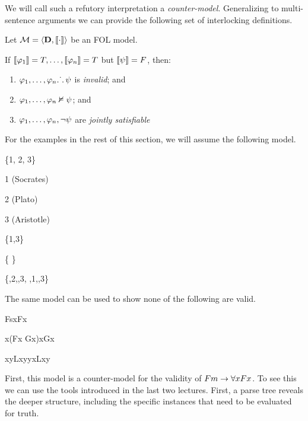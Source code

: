 We will call such a refutory interpretation a \emph{counter-model}. Generalizing
to multi-sentence arguments we can provide the following set of interlocking
definitions.

\begin{definition}
  \label{def:fol-countermodel-effects}
  Let $\mathcal{M}=\langle\mathbf{D},\llbracket\cdot\rrbracket\rangle$ be an FOL model.

  If $\llbracket\varphi_1\rrbracket=T,\dots,\llbracket\varphi_n\rrbracket=T$ but $\llbracket\psi\rrbracket=F$,
  then:\\
  \begin{enumerate}
  \item $\varphi_1,\dots,\varphi_n\ldotp\dot{}\,\ldotp\psi$ is \emph{invalid}; and
  \item $\varphi_1,\dots,\varphi_n\nvDash\psi$; and
  \item $\varphi_1,\dots,\varphi_n,\neg\psi$ are \emph{jointly satisfiable}
  \end{enumerate}
\end{definition}

For the examples in the rest of this section, we will assume the following
model.

\begin{grayarg}
\item[\textbf{D:}] \{1, 2, 3\}
\item[s:] 1 (Socrates)
\item[p:] 2 (Plato)
\item[ ]  3 (Aristotle)
\item[F:] \{1,3\}
\item[G:] \{ \} 
\item[L:] \{,2\textrangle,,3\textrangle,
  ,1\textrangle,,3\textrangle\}
\end{grayarg}

The same model can be used to show none of the following are valid.

\begin{argument}
\item[ ] Fs\therefore\eforall xFx
\item[ ] \eexists x(Fx \eor Gx)\therefore\eexists xGx
\item[ ] \eforall x\eexists yLxy\therefore\eexists y\eforall xLxy
\end{argument}

First, this model is a counter-model for the validity of $Fm\rightarrow\forall xFx$.
To see this we can use the tools introduced in the last two lectures. First, a
parse tree reveals the deeper structure, including the specific instances that
need to be evaluated for truth.

